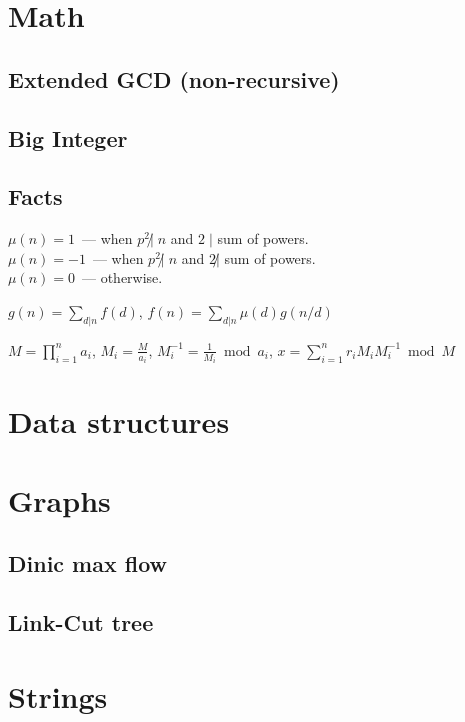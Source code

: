 \documentclass[11pt]{article}
\begin{document}
\pagestyle{fancy}
\newpage

\section{Math}
\subsection{Extended GCD (non-recursive)}

\subsection{Big Integer}

\subsection{Facts}
$\mu(n) = 1$~--- when $p^2 \not| \;n$ and $2 \;|$ sum of powers.\\
$\mu(n) = -1$~--- when $p^2 \not| \;n$ and $2 \not|$ sum of powers.\\
$\mu(n) = 0$~--- otherwise.

$g(n) = \sum_{d | n}f(d)$, $f(n) = \sum_{d | n}\mu(d)g(n/d)$

$M={\displaystyle \prod _{{i=1}}^{n}a_{i}}$,
$M_{i}={\frac  M{a_{i}}}$,
$M_{i}^{{-1}}={\frac  1{M_{i}}}{\bmod  {a_{i}}}$,
$x=\sum_{i=1}^{n}r_{i}M_{i}M_{i}^{-1}\bmod M$

\section{Data structures}

\section{Graphs}
\subsection{Dinic max flow}

\subsection{Link-Cut tree}


\section{Strings}
%
\end{document}
